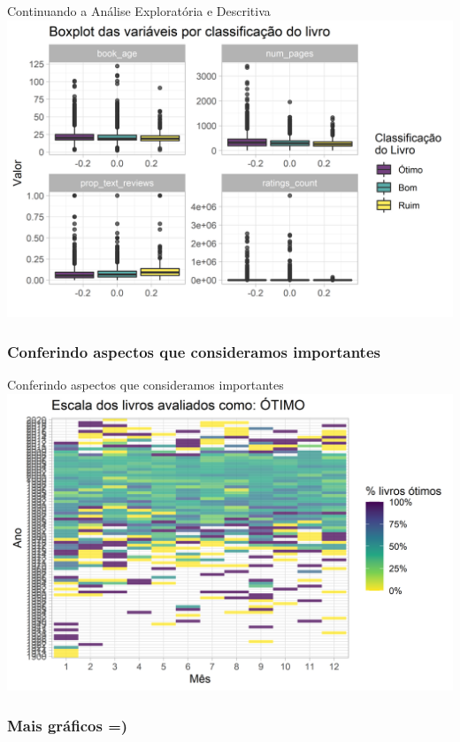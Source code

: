 \documentclass[
  9 pt,
  ignorenonframetext,
]{beamer}
\begin{document}
\begin{frame}{Continuando a Análise Exploratória e Descritiva}
\includegraphics{apresentacao_files/figure-beamer/unnamed-chunk-7-1.png}
\end{frame}

\hypertarget{conferindo-aspectos-que-consideramos-importantes}{%
\subsubsection{Conferindo aspectos que consideramos
importantes}\label{conferindo-aspectos-que-consideramos-importantes}}

\begin{frame}{Conferindo aspectos que consideramos importantes}
\includegraphics{apresentacao_files/figure-beamer/unnamed-chunk-8-1.png}
\end{frame}

\hypertarget{mais-gruxe1ficos}{%
\subsubsection{Mais gráficos =)}\label{mais-gruxe1ficos}}
\end{document}
